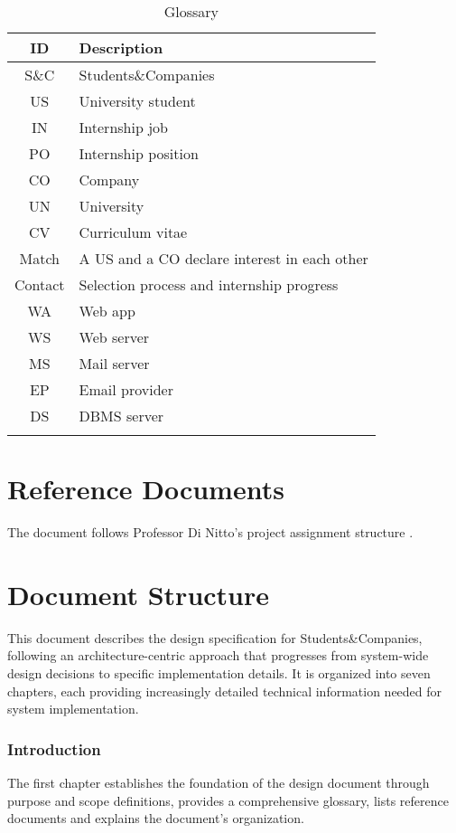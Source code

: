 \renewcommand{\arraystretch}{1.5}
\begin{longtable}{|c|p{8.5cm}|}
    \hline \rowcolor{polimiblue!40}
    \textbf{ID} & \textbf{Description} \\ \hline
    S\&C & Students\&Companies \\ \hline
    US & University student \\ \hline
    IN & Internship job \\ \hline
    PO & Internship position \\ \hline
    CO & Company \\ \hline
    UN & University \\ \hline
    CV & Curriculum vitae \\ \hline
    Match & A US and a CO declare interest in each other \\ \hline
    Contact & Selection process and internship progress \\ \hline
    WA & Web app \\ \hline
    WS & Web server \\ \hline
    MS & Mail server \\ \hline
    EP & Email provider \\ \hline
    DS & DBMS server \\ \hline
\caption{Glossary}
\end{longtable}

\section{Reference Documents}
The document follows Professor Di Nitto's project assignment structure \cite{dinitto2024}.

\section{Document Structure}
This document describes the design specification for Students\&Companies, following an architecture-centric approach that progresses from system-wide design decisions to specific implementation details.
It is organized into seven chapters, each providing increasingly detailed technical information needed for system implementation.

\subsubsection{Introduction}
The first chapter establishes the foundation of the design document through purpose and scope definitions, provides a comprehensive glossary, lists reference documents and explains the document's organization.

